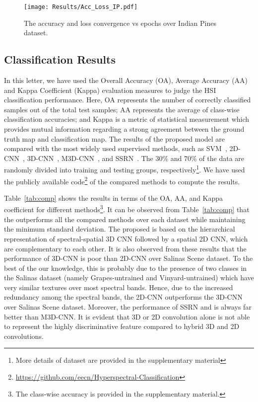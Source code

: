 \documentclass[journal]{IEEEtran}
\begin{document}
\begin{figure}[!t]
\centering
\texttt{[image: Results/Acc\_Loss\_IP.pdf]}\caption{The accuracy and loss convergence vs epochs over Indian Pines dataset.}
\label{fig:acc_loss}
\end{figure}






\subsection{Classification Results}
In this letter, we have used the Overall Accuracy (OA), Average Accuracy (AA) and Kappa Coefficient (Kappa) evaluation measures to judge the HSI classification performance. Here, OA represents the number of correctly classified samples out of the total test samples; AA represents the average of class-wise classification accuracies; and Kappa is a metric of statistical measurement which provides mutual information regarding a strong agreement between the ground truth map and classification map. The results of the  proposed  model are compared with the most widely used supervised methods, such as SVM~\cite{melgani2004classification}, 2D-CNN~\cite{makantasis2015deep}, 3D-CNN~\cite{hamida2018deep}, M3D-CNN~\cite{he2017multi}, and SSRN~\cite{zhong2018spectral}. The 30\% and 70\% of the data are randomly divided into training and testing groups, respectively\footnote{More details of dataset are provided in the supplementary material}. We have used the publicly available code\footnote{\url{https://github.com/eecn/Hyperspectral-Classification}} of the compared methods to compute the results.

Table~\ref{tab:comp} shows the results in terms of the OA, AA, and Kappa coefficient for different methods\footnote{The class-wise accuracy is provided in the supplementary material.}. It can be observed from Table~\ref{tab:comp} that the  outperforms all the compared methods over each dataset while maintaining the minimum standard deviation. The proposed  is based on the hierarchical representation of spectral-spatial 3D CNN followed by a spatial 2D CNN, which are complementary to each other. 
It is also observed from these results that the performance of 3D-CNN is poor than 2D-CNN over Salinas Scene dataset. To the best of the our knowledge, this is probably due to the presence of two classes in the Salinas dataset (namely Grapes-untrained and Vinyard-untrained) which have very similar textures over most spectral bands. Hence, due to the increased redundancy among the spectral bands, the 2D-CNN outperforms the 3D-CNN over Salinas Scene dataset.
Moreover, the performance of SSRN and  is always far better than M3D-CNN. It is evident that 3D or 2D convolution alone is not able to represent the highly discriminative feature compared to hybrid 3D and 2D convolutions.
\end{document}
